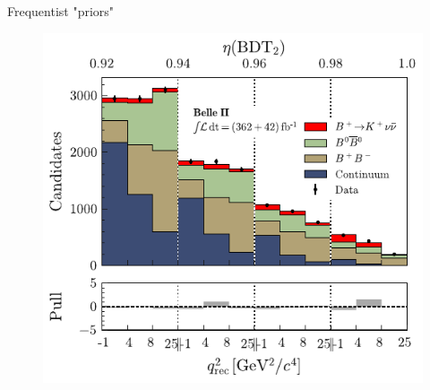 \documentclass[
aspectratio=169,
14pt,
professionalfonts
]{beamer}
\begin{document}
\begin{frame}{Frequentist "priors"}
\begin{minipage}{0.29\textwidth}
\begin{figure}
            \includegraphics[width=\textwidth]{../plots/knunu-signal.pdf}
        \end{figure}
    \end{minipage}
    \end{frame}
    
\end{document}
